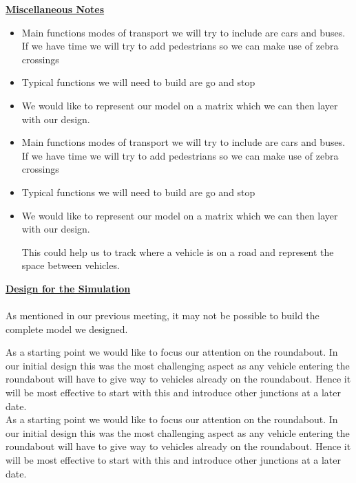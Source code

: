 \documentclass{article}
\begin{document}
	{\bf\underline{Miscellaneous Notes}}
	\begin{itemize}

		\item Main functions modes of transport we will try to include are cars and buses.
		 If we have time we will try to add pedestrians so we can make use of zebra crossings
		\item Typical functions we will need to build are go and stop \\
		\item We would like to represent our model on a matrix which we can then layer with our design. 

		\item Main functions modes of transport we will try to include are cars and buses. 
		If we have time we will try to add pedestrians so we can make use of zebra crossings
		\item Typical functions we will need to build are go and stop \\
		\item We would like to represent our model on a matrix which we can then layer with our design.

		This could help us to track where a vehicle is on a road and represent the space between vehicles. 
	\end{itemize}	

	\vspace{2cm}

	{\bf\underline{Design for the Simulation}}\\\\
	As mentioned in our previous meeting, it may not be possible to build the complete model we designed.

	 As a starting point we would like to focus our attention on the roundabout. 
	 In our initial design this was the most challenging aspect as any vehicle entering the roundabout will have to give way to vehicles already on the roundabout. 
	 Hence it will be most effective to start with this and introduce other junctions at a later date.\\

	As a starting point we would like to focus our attention on the roundabout. 
	In our initial design this was the most challenging aspect as any vehicle entering the roundabout will have to give way to vehicles already on the roundabout. Hence it will be most effective to start with this and introduce other junctions at a later date.\\
\end{document}
